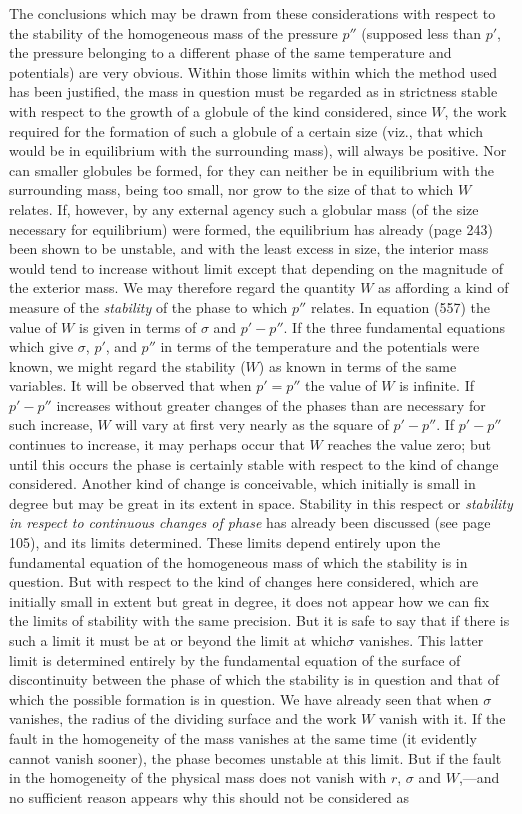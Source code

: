 \documentclass[12pt]{article}
\begin{document}
{The conclusions which may be drawn from these considerations with respect to the stability of the homogeneous mass of the pressure $p''$ (supposed less than $p'$, the pressure belonging to a different phase of the same temperature and potentials) are very obvious. Within those limits within which the method used has been justified, the mass in question must be regarded as in strictness stable with respect to the growth of a globule of the kind considered, since $W$, the work required for the formation of such a globule of a certain size (viz., that which would be in equilibrium with the surrounding mass), will always be positive. 
Nor can smaller globules be formed, for they can neither be in equilibrium with the surrounding mass, being too small, nor grow to the size of that to which $W$ relates. If, however, by any external agency such a globular mass (of the size necessary for equilibrium) were formed, the equilibrium has already (page 243) been shown to be unstable, and with the least excess in size, the interior mass would tend to increase without limit except that depending on the magnitude of the exterior mass. We may therefore regard the quantity $W$ as affording a kind of measure of the \textit{stability} of the phase to which $p''$ relates. In equation (557) the value of $W$ is given in terms of $\sigma$ and $p'-p''$. If the three fundamental equations which give $\sigma$, $p'$, and $p''$ in terms of the temperature and the potentials were known, we might regard the stability ($W$) as known in terms of the same variables. It will be observed that when $p'=p''$ the value of $W$ is infinite. If $p'-p''$ increases without greater changes of the phases than are necessary for such increase, $W$ will vary at first very nearly as the square of $p'-p''$. If $p'-p''$ continues to increase, it may perhaps occur that $W$ reaches the value zero; but until this occurs the phase is certainly stable with respect to the kind of change considered. Another kind of change is conceivable, which initially is small in degree but may be great in its extent in space. Stability in this respect or \emph{stability in respect to continuous changes of phase} has already been discussed (see page 105), and its limits determined. These limits depend entirely upon the fundamental equation of the homogeneous mass of which the stability is in question. But with respect to the kind of changes here considered, which are initially small in extent but great in degree, it does not appear how we can fix the limits of stability with the same precision. But it is safe to say that if there is such a limit it must be at or beyond the limit at which$\sigma$ vanishes. This latter limit is determined entirely by the fundamental equation of the surface of discontinuity between the phase of which the stability is in question and that of which the possible formation is in question. We have already seen that when $\sigma$ vanishes, the radius of the dividing surface and the work $W$ vanish with it. If the fault in the homogeneity of the mass vanishes at the same time (it evidently cannot vanish sooner), the phase becomes unstable at this limit. But if the fault in the homogeneity of the physical mass does not vanish with $r$, $\sigma$ and $W$,---and no sufficient reason appears why this should not be considered as }
\end{document}
